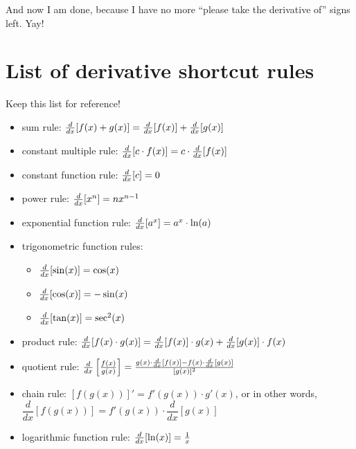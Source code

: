 And now I am done, because I have no more ``please take the derivative of'' signs left. Yay!

\pagebreak

\section{List of derivative shortcut rules}

Keep this list for reference!
{ \everymath{\displaystyle}
    \begin{itemize}[label=\(\square\)]
        \item sum rule: $\frac{d}{dx}[f(x)+g(x)] = \frac{d}{dx}[f(x)]+\frac{d}{dx}[g(x)]$ 
        \item constant multiple rule: $\frac{d}{dx}[c\cdot f(x)] = c\cdot\frac{d}{dx}[f(x)]$
        \item constant function rule: $\frac{d}{dx}[c] = 0$
        \item power rule: $\frac{d}{dx}[x^n] = nx^{n-1}$
        \item exponential function rule: $\frac{d}{dx}[a^x] = a^x\cdot\ln(a)$
        \item[] trigonometric function rules: 
        \begin{itemize}[label=\(\bigcirc\)]
            \item $\frac{d}{dx}[\sin(x)] = \cos(x)$
            \item $\frac{d}{dx}[\cos(x)] = -\sin(x)$
            \item $\frac{d}{dx}[\tan(x)] = \sec^2(x)$
        \end{itemize}
        \item product rule: $\frac{d}{dx}[f(x) \cdot g(x)] = \frac{d}{dx}[f(x)] \cdot g(x) + \frac{d}{dx}[g(x)] \cdot f(x)$
        \item quotient rule: $\frac{d}{dx}\left[\frac{f(x)}{g(x)}\right] 
        = \frac{g(x) \cdot \frac{d}{dx}[f(x)] - f(x) \cdot \frac{d}{dx}[g(x)]}{[g(x)]^2}$
        \item chain rule: $[f(g(x))]' = f'(g(x)) \cdot g'(x)$, or in other words, $\dfrac{d}{dx}\left[ f(g(x)) \right] = f'(g(x)) \cdot \dfrac{d}{dx}\left[ g(x) \right]$
        \item logarithmic function rule: $\frac{d}{dx}[\ln(x)] = \frac{1}{x}$
\end{itemize}}
